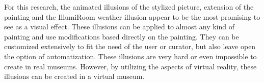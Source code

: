 \documentclass[a4paper]{article}
\begin{document}
For this research, the animated illusions of the stylized picture, extension of the painting and the IllumiRoom weather illusion appear to be the most promising to see as a visual effect. These illusions can be applied to almost any kind of painting and use modifications based directly on the painting. They can be customized extensively to fit the need of the user or curator, but also leave open the option of automatization. These illusions are very hard or even impossible to create in real museums. However, by utilizing the aspects of virtual reality, these illusions can be created in a virtual museum.

\end{document}
